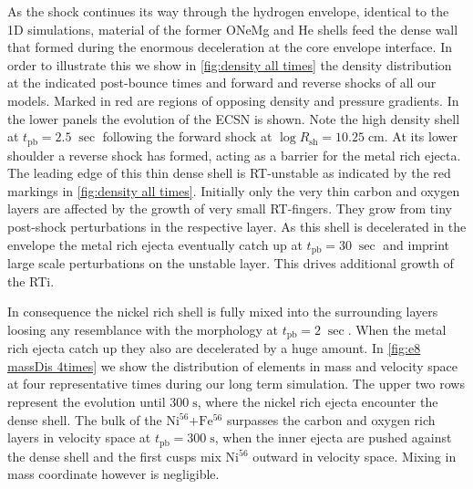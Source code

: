 \documentclass[fleqn,usenatbib]{mnras}
\newcommand{\tpb}{\ensuremath{t_\mathrm{pb}}}
\newcommand{\nickel}{$\mathrm{Ni^{56}}$\xspace}
\newcommand{\iron}{$\mathrm{Fe^{56}}$\xspace}
\begin{document}
As the shock continues its way through the hydrogen envelope, identical to the 1D simulations, material of the former ONeMg and He shells feed the dense wall that formed during the enormous deceleration at the core envelope interface. In order to illustrate this we show in \autoref{fig:density all times} the density distribution at the indicated post-bounce times and forward and reverse shocks of all our models. Marked in red are regions of opposing density and pressure gradients.
In the lower panels the evolution of the ECSN is shown. Note the high density shell at $\tpb=2.5\;\sec$ following the forward shock at $\log{R_{\mathrm{sh}}}=10.25\;\mathrm{cm}$. 
At its lower shoulder a reverse shock has formed, acting as a barrier for the metal rich ejecta. The leading edge of this thin dense shell is RT-unstable as indicated by the red markings in \autoref{fig:density all times}. Initially only the very thin carbon and oxygen layers are affected by the growth of very small RT-fingers. They grow from tiny post-shock perturbations in the respective layer. As this shell is decelerated in the envelope the metal rich ejecta eventually catch up at $\tpb=30\;\sec$ and imprint large scale perturbations on the unstable layer. This drives additional growth of the RTi.

In consequence the nickel rich shell is fully mixed into the surrounding layers loosing any resemblance with the morphology at $\tpb=2\;\sec$. 
When the metal rich ejecta catch up they also are decelerated by a huge amount.
In \autoref{fig:e8 massDis 4times} we show the distribution of elements in mass and velocity space at four representative times during our long term simulation. The upper two rows represent the evolution until $300\;\mathrm{s}$, where the nickel rich ejecta encounter the dense shell.
The bulk of the \nickel+\iron surpasses the carbon and oxygen rich layers in velocity space at $t_{\mathrm{pb}}=300\;\mathrm{s}$, when the inner ejecta are pushed against the dense shell and the first cusps mix \nickel outward in velocity space. Mixing in mass coordinate however is negligible.
\end{document}
